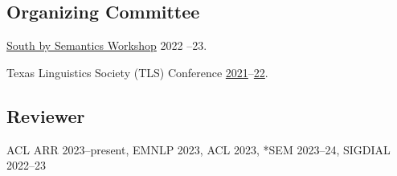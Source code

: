 \subsection{Organizing Committee}

\quad \href{https://sites.utexas.edu/sxsemantics}{South by Semantics Workshop} 2022 --23.

\quad Texas Linguistics Society (TLS) Conference \href{http://tls.ling.utexas.edu/2021/}{2021}--\href{http://tls.ling.utexas.edu/2022/}{22}.

\subsection{Reviewer}

\quad ACL ARR 2023--present, EMNLP 2023, ACL 2023, *SEM 2023--24, SIGDIAL 2022--23
